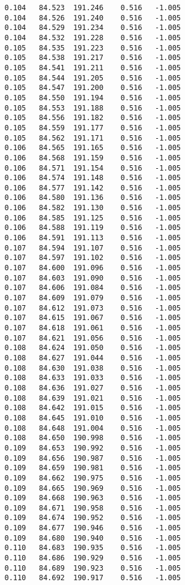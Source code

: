 \begin{verbatim}
   0.104   84.523  191.246    0.516   -1.005
   0.104   84.526  191.240    0.516   -1.005
   0.104   84.529  191.234    0.516   -1.005
   0.104   84.532  191.228    0.516   -1.005
   0.105   84.535  191.223    0.516   -1.005
   0.105   84.538  191.217    0.516   -1.005
   0.105   84.541  191.211    0.516   -1.005
   0.105   84.544  191.205    0.516   -1.005
   0.105   84.547  191.200    0.516   -1.005
   0.105   84.550  191.194    0.516   -1.005
   0.105   84.553  191.188    0.516   -1.005
   0.105   84.556  191.182    0.516   -1.005
   0.105   84.559  191.177    0.516   -1.005
   0.105   84.562  191.171    0.516   -1.005
   0.106   84.565  191.165    0.516   -1.005
   0.106   84.568  191.159    0.516   -1.005
   0.106   84.571  191.154    0.516   -1.005
   0.106   84.574  191.148    0.516   -1.005
   0.106   84.577  191.142    0.516   -1.005
   0.106   84.580  191.136    0.516   -1.005
   0.106   84.582  191.130    0.516   -1.005
   0.106   84.585  191.125    0.516   -1.005
   0.106   84.588  191.119    0.516   -1.005
   0.106   84.591  191.113    0.516   -1.005
   0.107   84.594  191.107    0.516   -1.005
   0.107   84.597  191.102    0.516   -1.005
   0.107   84.600  191.096    0.516   -1.005
   0.107   84.603  191.090    0.516   -1.005
   0.107   84.606  191.084    0.516   -1.005
   0.107   84.609  191.079    0.516   -1.005
   0.107   84.612  191.073    0.516   -1.005
   0.107   84.615  191.067    0.516   -1.005
   0.107   84.618  191.061    0.516   -1.005
   0.107   84.621  191.056    0.516   -1.005
   0.108   84.624  191.050    0.516   -1.005
   0.108   84.627  191.044    0.516   -1.005
   0.108   84.630  191.038    0.516   -1.005
   0.108   84.633  191.033    0.516   -1.005
   0.108   84.636  191.027    0.516   -1.005
   0.108   84.639  191.021    0.516   -1.005
   0.108   84.642  191.015    0.516   -1.005
   0.108   84.645  191.010    0.516   -1.005
   0.108   84.648  191.004    0.516   -1.005
   0.108   84.650  190.998    0.516   -1.005
   0.109   84.653  190.992    0.516   -1.005
   0.109   84.656  190.987    0.516   -1.005
   0.109   84.659  190.981    0.516   -1.005
   0.109   84.662  190.975    0.516   -1.005
   0.109   84.665  190.969    0.516   -1.005
   0.109   84.668  190.963    0.516   -1.005
   0.109   84.671  190.958    0.516   -1.005
   0.109   84.674  190.952    0.516   -1.005
   0.109   84.677  190.946    0.516   -1.005
   0.109   84.680  190.940    0.516   -1.005
   0.110   84.683  190.935    0.516   -1.005
   0.110   84.686  190.929    0.516   -1.005
   0.110   84.689  190.923    0.516   -1.005
   0.110   84.692  190.917    0.516   -1.005

\end{verbatim}
